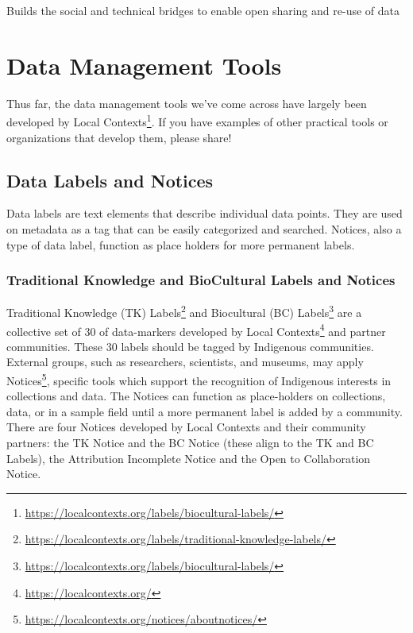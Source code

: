 \documentclass[
  11pt,
  paperpaper,
  openany]{book}
\DeclareRobustCommand{\href}[2]{#2\footnote{\url{#1}}}
\begin{document}
Builds the social and technical bridges to enable open sharing and re-use of data

\hypertarget{data-management-tools}{%
\chapter{Data Management Tools}\label{data-management-tools}}

Thus far, the data management tools we've come across have largely been developed by \href{https://localcontexts.org/labels/biocultural-labels/}{Local Contexts}. If you have examples of other practical tools or organizations that develop them, please share!

\hypertarget{data-labels-and-notices}{%
\section{Data Labels and Notices}\label{data-labels-and-notices}}

Data labels are text elements that describe individual data points. They are used on metadata as a tag that can be easily categorized and searched. Notices, also a type of data label, function as place holders for more permanent labels.

\hypertarget{traditional-knowledge-and-biocultural-labels-and-notices}{%
\subsection{Traditional Knowledge and BioCultural Labels and Notices}\label{traditional-knowledge-and-biocultural-labels-and-notices}}

\href{https://localcontexts.org/labels/traditional-knowledge-labels/}{Traditional Knowledge (TK) Labels} and \href{https://localcontexts.org/labels/biocultural-labels/}{Biocultural (BC) Labels} are a collective set of 30 of data-markers developed by \href{https://localcontexts.org/}{Local Contexts} and partner communities. These 30 labels should be tagged by Indigenous communities. External groups, such as researchers, scientists, and museums, may apply \href{https://localcontexts.org/notices/aboutnotices/}{Notices}, specific tools which support the recognition of Indigenous interests in collections and data. The Notices can function as place-holders on collections, data, or in a sample field until a more permanent label is added by a community. There are four Notices developed by Local Contexts and their community partners: the TK Notice and the BC Notice (these align to the TK and BC Labels), the Attribution Incomplete Notice and the Open to Collaboration Notice.
\end{document}
